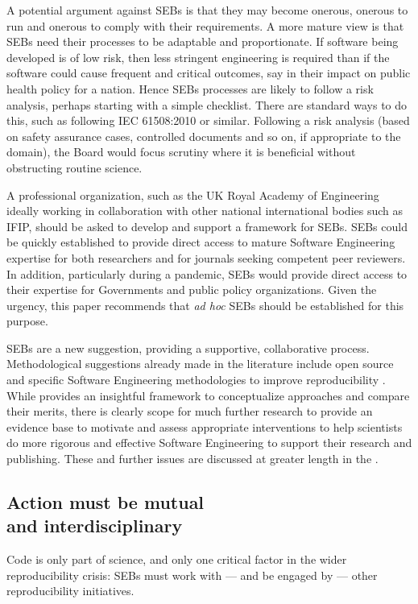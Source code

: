 \documentclass{comjnl}
\begin{document}
A potential argument against SEBs is that they may become onerous, onerous to run and onerous to comply with their requirements. A more mature view is that SEBs need their processes to be adaptable and proportionate. If software being developed is of low risk, then less stringent engineering is required than if the software could cause frequent and critical outcomes, say in their impact on public health policy for a nation. Hence SEBs processes are likely to follow a risk analysis, perhaps starting with a simple checklist. {There are standard ways to do this, such as following IEC 61508:2010 \cite{redmill,iec61508} or similar. Following a risk analysis (based on safety assurance cases, controlled documents and so on, if appropriate to the domain), the Board would focus scrutiny where it is beneficial without obstructing routine science.}

A professional organization, such as the UK Royal Academy of Engineering ideally working in collaboration with other national international bodies such as IFIP, should be asked to develop and support a framework for SEBs. SEBs could be quickly established to provide direct access to mature Software Engineering expertise for both researchers and for journals seeking competent peer reviewers. In addition, particularly during a pandemic, SEBs would provide direct access to their expertise for Governments and public policy organizations. Given the urgency, this paper recommends that \emph{ad hoc\/} SEBs should be established for this purpose.

SEBs are a new suggestion, providing a supportive, collaborative process. Methodological suggestions already made in the literature include open source and specific Software Engineering methodologies to improve reproducibility \cite{basic-reproducibilty,open-source}. While \cite{ABCs-SE} provides an insightful framework to conceptualize approaches and compare their merits, there is clearly scope for much further research to provide an evidence base to motivate and assess appropriate interventions to help scientists do more rigorous and effective Software Engineering to support their research and publishing. These and further issues are discussed at greater length in the \supplement. 

\subsection{Action must be mutual \\ and interdisciplinary}
\setcounter{footnote}{1}
Code is only part of science, and only one critical factor in the wider reproducibility crisis: SEBs must work with --- and be engaged by --- other reproducibility initiatives.
 
\end{document}
